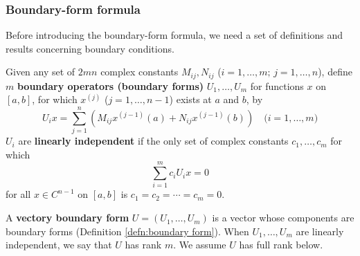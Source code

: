 \documentclass[11pt, oneside, a4paper]{article}
\begin{document}
\subsubsection{Boundary-form formula}
Before introducing the boundary-form formula, we need a set of definitions and results concerning boundary conditions.

\begin{defn}\cite[p.286]{CoddingtonLevinson}\label{defn:boundary form}
    Given any set of $2mn$ complex constants $M_{ij}, N_{ij}$ ($i=1,\ldots, m;\,j=1,\ldots,n$), define $m$ \textbf{boundary operators (boundary forms)} $U_1,\ldots,U_m$ for functions $x$ on $[a,b]$, for which $x^{(j)}$ ($j=1,\ldots,n-1$) exists at $a$ and $b$, by
    \begin{equation}\label{eq:U_i defn}
        U_i x = \sum_{j=1}^n (M_{ij}x^{(j-1)}(a) + N_{ij}x^{(j-1)}(b))\quad\mbox{($i=1,\ldots,m$)} 
    \end{equation}
    $U_i$ are \textbf{linearly independent} if the only set of complex constants $c_1, \ldots, c_m$ for which
    \[\sum_{i=1}^m c_i U_ix=0\]
    for all $x\in C^{n-1}$ on $[a,b]$ is $c_1=c_2=\cdots =c_m=0$.
\end{defn}

\begin{defn}\cite[p.286]{CoddingtonLevinson}\label{defn:vectory boundary form}
    A \textbf{vectory boundary form} $U=(U_1,\ldots,U_m)$ is a vector whose components are boundary forms (Definition \ref{defn:boundary form}). When $U_1,\ldots,U_m$ are linearly independent, we say that $U$ has rank $m$. We assume $U$ has full rank below.
\end{defn}
\end{document}
